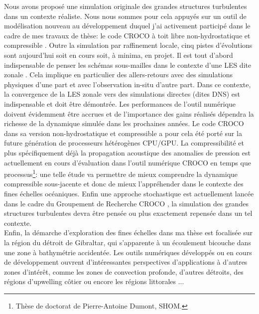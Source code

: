 Nous avons proposé une simulation originale des grandes structures turbulentes dans un contexte réaliste. Nous nous sommes pour cela appuyés sur un outil de modélisation nouveau au développement duquel j'ai activement participé dans le cadre de mes travaux de thèse: le code CROCO à toit libre non-hydrostatique et compressible \citep{hilt_2020}. Outre la simulation par raffinement locale, cinq pistes d'évolutions sont aujourd'hui soit en cours soit, à minima, en projet. Il est tout d'abord indispensable de penser les schémas sous-mailles dans le contexte d'une LES dite zonale \cite{friess_modelisation_2010}. Cela implique en particulier des allers-retours avec des simulations physiques d'une part et avec l'observation in-situ d'autre part. Dans ce contexte, la convergence de la LES zonale vers des simulations directes (dites DNS) est indispensable et doit être démontrée. Les performances de l'outil numérique doivent évidemment être accrues et de l'importance des gains réalisés dépendra la richesse de la dynamique simulée dans les prochaines années. Le code CROCO dans sa version non-hydrostatique et compressible a pour cela été porté sur la future génération de processeurs hétérogènes CPU/GPU. La compressibilité et plus spécifiquement déjà la propagation acoustique des anomalies de pression est actuellement en cours d'évaluation dans l'outil numérique CROCO en temps que processus\footnote{Thèse de doctorat de Pierre-Antoine Dumont, SHOM.}: une telle étude va permettre de mieux comprendre la dynamique compressible sous-jacente et donc de mieux l'appréhender dans le contexte des fines échelles océaniques. Enfin une approche stochastique est actuellement lancée dans le cadre du Groupement de Recherche CROCO \citep{memin_fluid_2014}, la simulation des grandes structures turbulentes devra être pensée ou plus exactement repensée dans un tel contexte.\\
\color{black}
Enfin, la démarche d'exploration des fines échelles dans ma thèse est focalisée sur la région du détroit de Gibraltar, qui s'apparente à un écoulement bicouche dans une zone à bathymétrie accidentée. Les outils numériques développés ou en cours de développement ouvrent d'intéressantes perspectives d'applications à d'autres zones d'intérêt, comme les zones de convection profonde, d'autres détroits, des régions d'upwelling côtier ou encore les régions littorales \citep{marchesiello_tridimensional_2021}...




